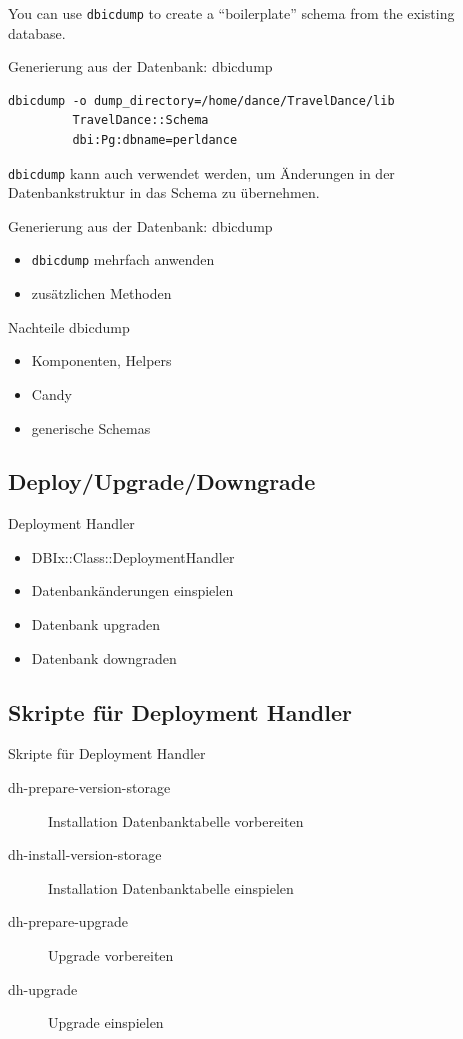 You can use \verb|dbicdump| to create a ``boilerplate'' schema from the
existing database.

\begin{frame}[fragile]{Generierung aus der Datenbank: dbicdump}
\begin{lstlisting}
dbicdump -o dump_directory=/home/dance/TravelDance/lib 
         TravelDance::Schema 
         dbi:Pg:dbname=perldance
\end{lstlisting}
\end{frame}

\verb|dbicdump| kann auch verwendet werden, um Änderungen in
der Datenbankstruktur in das Schema zu übernehmen.

\begin{frame}[fragile]{Generierung aus der Datenbank: dbicdump}
\begin{itemize}
\item \verb|dbicdump| mehrfach anwenden
\item zusätzlichen Methoden
\end{itemize}
\end{frame}

\begin{frame}[fragile]{Nachteile dbicdump}
\begin{itemize}
\item Komponenten, Helpers
\item Candy
\item generische Schemas
\end{itemize}
\end{frame}

\subsection{Deploy/Upgrade/Downgrade}

\begin{frame}{Deployment Handler}
\begin{itemize}
\item DBIx::Class::DeploymentHandler
\item Datenbankänderungen einspielen
\item Datenbank upgraden
\item Datenbank downgraden
\end{itemize}
\end{frame}

\subsection{Skripte für Deployment Handler}
\begin{frame}{Skripte für Deployment Handler}
\begin{description}
\item[dh-prepare-version-storage] Installation Datenbanktabelle vorbereiten
\item[dh-install-version-storage] Installation Datenbanktabelle einspielen
\item[dh-prepare-upgrade] Upgrade vorbereiten
\item[dh-upgrade] Upgrade einspielen
\end{description}
\end{frame}

